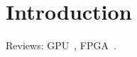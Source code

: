 \section{Introduction}
\label{sec:intro}

Reviews: GPU~\cite{mv15},
FPGA~\cite{ch02,ecv16,Trimberger15}.
